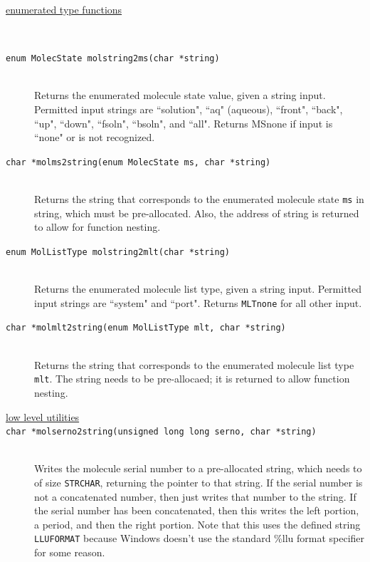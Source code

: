 \documentclass {scrbook}
\newcommand {\ttt} {\texttt}
\begin{document}
\begin{description}

\item[\underline{enumerated type functions}]
\hfill \\

\item[\ttt{enum MolecState molstring2ms(char *string)}]
\hfill \\
Returns the enumerated molecule state value, given a string input. Permitted input strings are ``solution", ``aq" (aqueous), ``front", ``back", ``up", ``down", ``fsoln", ``bsoln", and ``all". Returns MSnone if input is ``none" or is not recognized.

\item[\ttt{char *molms2string(enum MolecState ms, char *string)}]
\hfill \\
Returns the string that corresponds to the enumerated molecule state \ttt{ms} in string, which must be pre-allocated. Also, the address of string is returned to allow for function nesting.

\item[\ttt{enum MolListType molstring2mlt(char *string)}]
\hfill \\
Returns the enumerated molecule list type, given a string input. Permitted input strings are ``system" and ``port". Returns \ttt{MLTnone} for all other input.

\item[\ttt{char *molmlt2string(enum MolListType mlt, char *string)}]
\hfill \\
Returns the string that corresponds to the enumerated molecule list type \ttt{mlt}. The string needs to be pre-allocaed; it is returned to allow function nesting.

\item[\underline{low level utilities}]

\item[\ttt{char *molserno2string(unsigned long long serno, char *string)}]
\hfill \\
Writes the molecule serial number to a pre-allocated string, which needs to of size \ttt{STRCHAR}, returning the pointer to that string. If the serial number is not a concatenated number, then just writes that number to the string. If the serial number has been concatenated, then this writes the left portion, a period, and then the right portion. Note that this uses the defined string \ttt{LLUFORMAT} because Windows doesn't use the standard \%llu format specifier for some reason.


\end{description}
\end{document}
